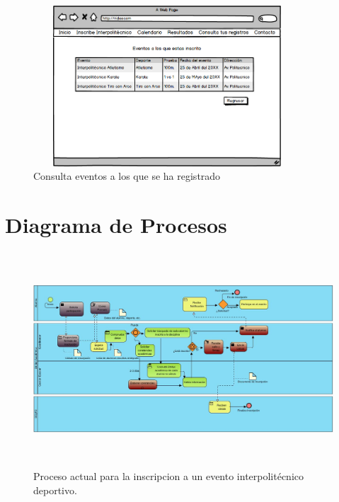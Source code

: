 		\begin{figure}[hbt!]
			\centering
			\includegraphics[width=10cm, height=6cm]{Imagenes/Disenos/p18ConsultaInscripciones.png}
			\caption{Consulta eventos a los que se ha registrado}
			\label{Consultainscripciones}
		\end{figure}

	\section{Diagrama de Procesos}	
		
		\begin{figure}[hbt!]
			\centering
			\includegraphics[width=16cm, height=8cm]{Imagenes/Disenos/ProcesoInscripcionActual.jpg}
			\caption{Proceso actual para la inscripcion a un evento interpolitécnico deportivo.}
			\label{ProcesoInscripcionActual}
		\end{figure}
	
